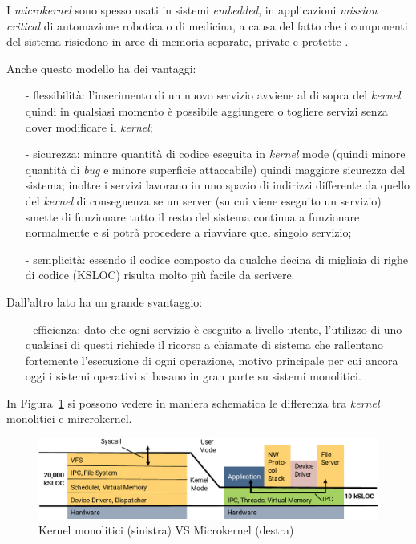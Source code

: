 I \textit{microkernel} sono spesso usati in sistemi \textit{embedded}, in applicazioni \textit{mission critical} di automazione robotica o di medicina, a causa del fatto che i componenti del sistema risiedono in aree di memoria separate, private e protette \cite{kernelWikipedia}.

Anche questo modello ha dei vantaggi:
\begin{itemize}
	\item[-] flessibilità: l'inserimento di un nuovo servizio avviene al di sopra del \textit{kernel} quindi in qualsiasi momento è possibile aggiungere o togliere servizi senza dover modificare il \textit{kernel};
	\item[-] sicurezza: minore quantità di codice eseguita in \textit{kernel} mode (quindi minore quantità di \textit{bug} e minore superficie attaccabile) quindi maggiore sicurezza del sistema; inoltre i servizi lavorano in uno spazio di indirizzi differente da quello del \textit{kernel} di conseguenza se un server (su cui viene eseguito un servizio) smette di funzionare tutto il resto del sistema continua a funzionare normalmente e si potrà procedere a riavviare quel singolo servizio;
	\item[-] semplicità: essendo il codice composto da qualche decina di migliaia di righe di codice (KSLOC) risulta molto più facile da scrivere.
\end{itemize}
Dall'altro lato ha un grande svantaggio:
\begin{itemize}
	\item[-] efficienza: dato che ogni servizio è eseguito a livello utente, l'utilizzo di uno qualsiasi di questi richiede il ricorso a chiamate di sistema che rallentano fortemente l'esecuzione di ogni operazione, motivo principale per cui ancora oggi i sistemi operativi si basano in gran parte su sistemi monolitici.
\end{itemize}
In Figura~\ref{fig:MonolithicVSmicrokernel} si possono vedere in maniera schematica le differenza tra \textit{kernel} monolitici e mircrokernel.

\begin{figure}[h]
  \includegraphics[width=\linewidth]{img/MonolithicVSmicrokernel.png}
  \caption{Kernel monolitici (sinistra) VS Microkernel (destra)}
  \label{fig:MonolithicVSmicrokernel}
\end{figure}
\newpage

